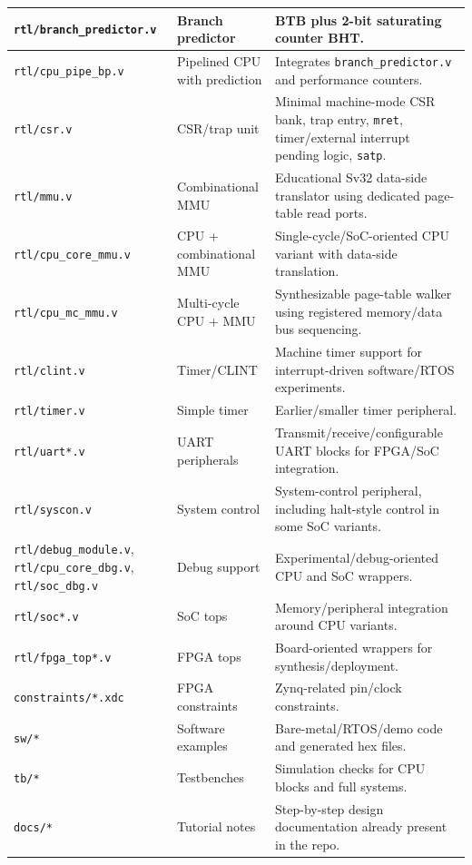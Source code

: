 \begin{longtable}{|>{\RaggedRight\arraybackslash}p{}|>{\RaggedRight\arraybackslash}p{}|>{\RaggedRight\arraybackslash}p{}|}
\hline
\texttt{rtl/branch\_predictor.v} & Branch predictor & BTB plus 2-bit saturating counter BHT. \\
\hline
\texttt{rtl/cpu\_pipe\_bp.v} & Pipelined CPU with prediction & Integrates \texttt{branch\_predictor.v} and performance counters. \\
\hline
\texttt{rtl/csr.v} & CSR/trap unit & Minimal machine-mode CSR bank, trap entry, \texttt{mret}, timer/external interrupt pending logic, \texttt{satp}. \\
\hline
\texttt{rtl/mmu.v} & Combinational MMU & Educational Sv32 data-side translator using dedicated page-table read ports. \\
\hline
\texttt{rtl/cpu\_core\_mmu.v} & CPU + combinational MMU & Single-cycle/SoC-oriented CPU variant with data-side translation. \\
\hline
\texttt{rtl/cpu\_mc\_mmu.v} & Multi-cycle CPU + MMU & Synthesizable page-table walker using registered memory/data bus sequencing. \\
\hline
\texttt{rtl/clint.v} & Timer/CLINT & Machine timer support for interrupt-driven software/RTOS experiments. \\
\hline
\texttt{rtl/timer.v} & Simple timer & Earlier/smaller timer peripheral. \\
\hline
\texttt{rtl/uart*.v} & UART peripherals & Transmit/receive/configurable UART blocks for FPGA/SoC integration. \\
\hline
\texttt{rtl/syscon.v} & System control & System-control peripheral, including halt-style control in some SoC variants. \\
\hline
\texttt{rtl/debug\_module.v}, \texttt{rtl/cpu\_core\_dbg.v}, \texttt{rtl/soc\_dbg.v} & Debug support & Experimental/debug-oriented CPU and SoC wrappers. \\
\hline
\texttt{rtl/soc*.v} & SoC tops & Memory/peripheral integration around CPU variants. \\
\hline
\texttt{rtl/fpga\_top*.v} & FPGA tops & Board-oriented wrappers for synthesis/deployment. \\
\hline
\texttt{constraints/*.xdc} & FPGA constraints & Zynq-related pin/clock constraints. \\
\hline
\texttt{sw/*} & Software examples & Bare-metal/RTOS/demo code and generated hex files. \\
\hline
\texttt{tb/*} & Testbenches & Simulation checks for CPU blocks and full systems. \\
\hline
\texttt{docs/*} & Tutorial notes & Step-by-step design documentation already present in the repo. \\
\hline
\end{longtable}

